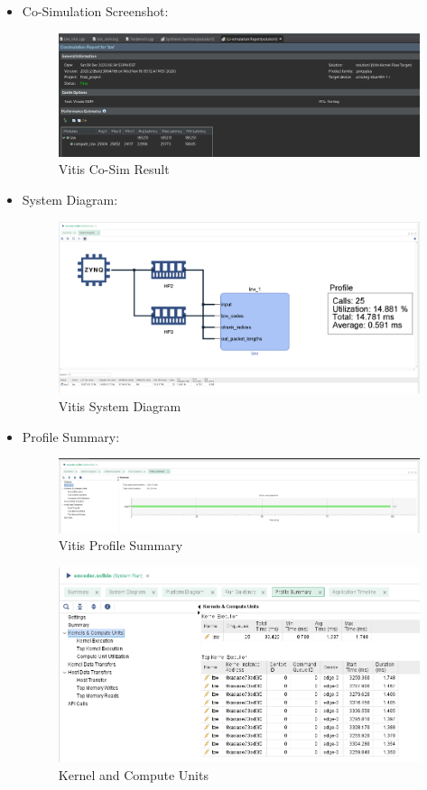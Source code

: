 \documentclass[../main.tex]{subfiles}
\begin{document}
\begin{itemize}
    \item Co-Simulation Screenshot:
    \begin{figure}[H]
        \centering
        \includegraphics[width=0.7\linewidth]{Images/image16.png}
        \caption{Vitis Co-Sim Result}
        \label{fig:vitis_result_co_sim}
    \end{figure}

    \item System Diagram:
    \begin{figure}[H]
        \centering
        \includegraphics[width=0.8\linewidth]{Images/image21.png}
        \caption{Vitis System Diagram}
        \label{fig:vitis_system_diag}
    \end{figure}

    \item Profile Summary:
    \begin{figure}[H]
        \centering
        \includegraphics[width=0.8\linewidth]{Images/image26.png}
        \caption{Vitis Profile Summary}
        \label{fig:vitis_prof_sum}
    \end{figure}

    \begin{figure}[H]
        \centering
        \includegraphics[width=0.8\linewidth]{Images/image14.png}
        \caption{Kernel and Compute Units}
        \label{fig:vitis_prof_sum_cu}
    \end{figure}
    
\end{itemize}
\end{document}
